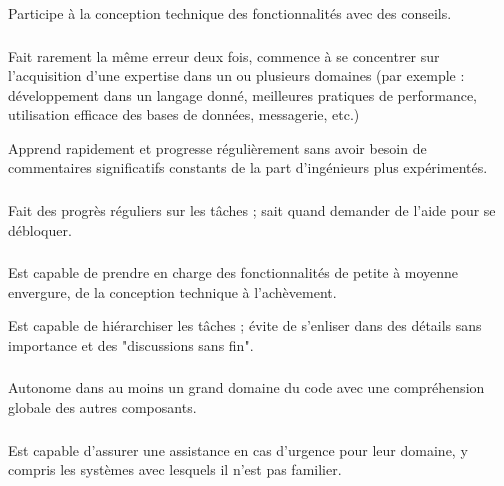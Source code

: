 \documentclass[a4paper, french, openany, 12pt]{book}
\newcommand\dex{\textcolor{BrickRed}{\textbf{\bsc{Dex}}}}
\newcommand\str{\textcolor{DarkOrchid}{\textbf{\bsc{Str}}}}
\newcommand\wis{\textcolor{MidnightBlue}{\textbf{\bsc{Wis}}}}
\newcommand\cha{\textcolor{RawSienna}{\textbf{\bsc{Cha}}}}
\begin{document}
Participe à la conception technique des fonctionnalités avec des conseils.

\subsubsection*{\dex}

Fait rarement la même erreur deux fois, commence à se concentrer sur l'acquisition d'une expertise dans un ou plusieurs 
domaines (par exemple : développement dans un langage donné, meilleures pratiques de performance, utilisation efficace 
des bases de données, messagerie, etc.)

Apprend rapidement et progresse régulièrement sans avoir besoin de commentaires significatifs constants de la part 
d'ingénieurs plus expérimentés.

\subsubsection*{\str}

Fait des progrès réguliers sur les tâches ; sait quand demander de l'aide pour se débloquer.

\subsubsection*{\str}

Est capable de prendre en charge des fonctionnalités de petite à moyenne envergure, de la conception technique à 
l'achèvement.

Est capable de hiérarchiser les tâches ; évite de s'enliser dans des détails sans importance et des "discussions sans 
fin".

\subsubsection*{\wis}

Autonome dans au moins un grand domaine du code avec une compréhension globale des autres composants.

\subsubsection*{\wis}

Est capable d'assurer une assistance en cas d'urgence pour leur domaine, y compris les systèmes avec lesquels il 
n'est pas familier.

\subsubsection*{\cha}
\end{document}
